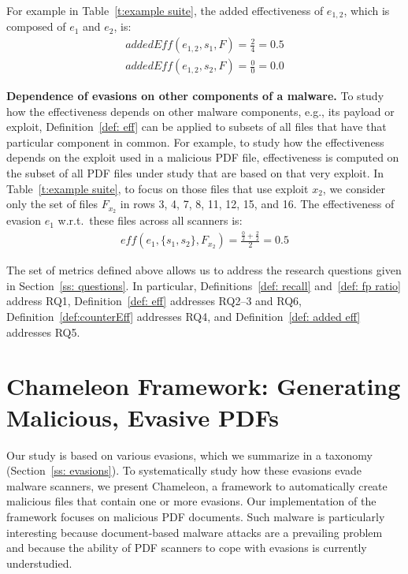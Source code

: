 For example in Table~\ref{t:example suite}, the added effectiveness of $e_{1,2}$, which is composed of $e_1$ and $e_2$, is:
\begin{gather*}
\mathit{addedEff}(e_{1,2}, s_1, F) = \frac{2}{4} = 0.5 \\
\mathit{addedEff}(e_{1,2}, s_2, F) = \frac{0}{0} = 0.0
\end{gather*}


\textbf{Dependence of evasions on other components of a malware.}
To study how the effectiveness depends on other malware components, e.g., its payload or exploit,
Definition~\ref{def: eff} can be applied to subsets of all files that have that particular component in common.
For example, to study how the effectiveness depends on the exploit used in a malicious PDF file, effectiveness is computed on the subset of all PDF files under study that are based on that very exploit.
In Table~\ref{t:example suite}, to focus on those files that use exploit $x_2$, we consider only the set of files $F_{x_2}$ in rows 3, 4, 7, 8, 11, 12, 15, and 16.
The effectiveness of evasion $e_1$ w.r.t.\ these files across all scanners is:
\begin{gather*}
\mathit{eff}(e_{1}, \{s_1, s_2\}, F_{x_2}) = \frac{\frac{0}{2} + \frac{2}{2}}{2} = 0.5
\end{gather*}



\medskip
The set of metrics defined above allows us to address the research questions given in Section~\ref{ss: questions}.
In particular, Definitions~\ref{def: recall} and~\ref{def: fp ratio} address RQ1, Definition~\ref{def: eff} addresses RQ2--3 and RQ6, Definition~\ref{def:counterEff} addresses RQ4, and Definition~\ref{def: added eff} addresses RQ5.


\section{Chameleon Framework: Generating Malicious, Evasive PDFs}
\label{ss: implementation}

Our study is based on various evasions, which we summarize in a taxonomy (Section~\ref{ss: evasions}).
To systematically study how these evasions evade malware scanners, we present Chameleon, a framework to automatically create malicious files that contain one or more evasions.
Our implementation of the framework focuses on malicious PDF documents.
Such malware is particularly interesting because document-based malware attacks are a prevailing problem~\cite{pdf_cve_statistics, officeonrise, exploit_CVE_2018_4990} and because the ability of PDF scanners to cope with evasions is currently understudied.

